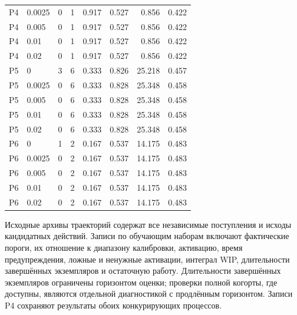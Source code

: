 \begin{longtable}{llrrrrrr}
P4 & 0.0025 & 0 & 1 & 0.917 & 0.527 & 0.856 & 0.422\\

P4 & 0.005 & 0 & 1 & 0.917 & 0.527 & 0.856 & 0.422\\

P4 & 0.01 & 0 & 1 & 0.917 & 0.527 & 0.856 & 0.422\\

P4 & 0.02 & 0 & 1 & 0.917 & 0.527 & 0.856 & 0.422\\

P5 & 0 & 3 & 6 & 0.333 & 0.826 & 25.218 & 0.457\\

P5 & 0.0025 & 0 & 6 & 0.333 & 0.828 & 25.348 & 0.458\\

P5 & 0.005 & 0 & 6 & 0.333 & 0.828 & 25.348 & 0.458\\

P5 & 0.01 & 0 & 6 & 0.333 & 0.828 & 25.348 & 0.458\\

P5 & 0.02 & 0 & 6 & 0.333 & 0.828 & 25.348 & 0.458\\

P6 & 0 & 1 & 2 & 0.167 & 0.537 & 14.175 & 0.483\\

P6 & 0.0025 & 0 & 2 & 0.167 & 0.537 & 14.175 & 0.483\\

P6 & 0.005 & 0 & 2 & 0.167 & 0.537 & 14.175 & 0.483\\

P6 & 0.01 & 0 & 2 & 0.167 & 0.537 & 14.175 & 0.483\\

P6 & 0.02 & 0 & 2 & 0.167 & 0.537 & 14.175 & 0.483\\

\bottomrule\end{longtable}\endgroup

Исходные архивы траекторий содержат все независимые поступления и исходы кандидатных действий. Записи по обучающим наборам включают фактические пороги, их отношение к диапазону калибровки, активацию, время предупреждения, ложные и ненужные активации, интеграл WIP, длительности завершённых экземпляров и остаточную работу. Длительности завершённых экземпляров ограничены горизонтом оценки; проверки полной когорты, где доступны, являются отдельной диагностикой с продлённым горизонтом. Записи P4 сохраняют результаты обоих конкурирующих процессов.


